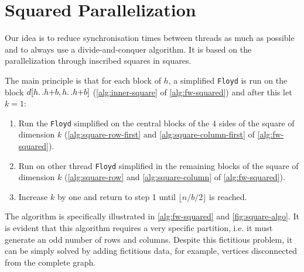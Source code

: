 \section{Squared Parallelization}\label{squared-parallelization}

Our idea is to reduce synchronisation times between threads as much as possible and to always use a divide-and-conquer algorithm. 
It is based on the parallelization through inscribed squares in squares.

The main principle is that for each block of \(h\), a simplified \texttt{Floyd} is run on the block \(d[h{\mathinner {\ldotp \ldotp}}h{+}b,h{\mathinner {\ldotp \ldotp}}h{+}b]\) (\cref{alg:inner-square} of \cref{alg:fw-squared}) and after this let \(k=1\):
\begin{enumerate}
    \item Run the \texttt{Floyd} simplified on the central blocks of the 4 sides of the square of dimension \(k\) (\cref{alg:square-row-first} and \ref{alg:square-column-first} of \cref{alg:fw-squared}).
    \item Run on other thread \texttt{Floyd} simplified in the remaining blocks of the square of dimension \(k\) (\cref{alg:square-row} and \ref{alg:square-column} of \cref{alg:fw-squared}).
    \item Increase \(k\) by one and return to step 1 until \(\lfloor n/b/2 \rfloor\) is reached.
\end{enumerate}
The algorithm is specifically illustrated in \cref{alg:fw-squared} and \cref{fig:square-algo}.
It is evident that this algorithm requires a very specific partition, i.e. it must generate an odd number of rows and columns. 
Despite this fictitious problem, it can be simply solved by adding fictitious data, for example, vertices disconnected from the complete graph.

